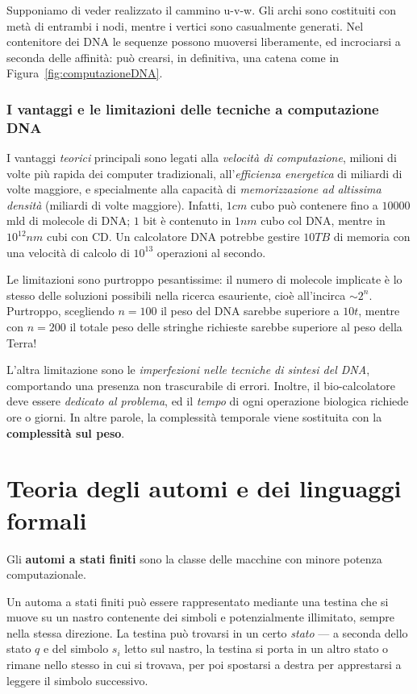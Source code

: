 \documentclass[10pt]{\classname}
\theoremstyle{definition}
\theoremstyle{definition}
\begin{document}
Supponiamo di veder realizzato il cammino u-v-w. Gli archi sono costituiti con
metà di entrambi i nodi, mentre i vertici sono casualmente generati. Nel
contenitore dei DNA le sequenze possono muoversi liberamente, ed incrociarsi a
seconda delle affinità: può crearsi, in definitiva, una catena come in
Figura~\ref{fig:computazioneDNA}.

\subsection{I vantaggi e le limitazioni delle tecniche a computazione DNA}

I vantaggi \emph{teorici} principali sono legati alla \emph{velocità di
computazione}, milioni di volte più rapida dei computer tradizionali,
all'\emph{efficienza energetica} di miliardi di volte maggiore, e specialmente
alla capacità di \emph{memorizzazione ad altissima densità} (miliardi di
volte maggiore). Infatti, $1cm$ cubo può contenere fino a $10000$ mld di
molecole di DNA; $1$ bit è contenuto in $1nm$ cubo col DNA, mentre in $10^{12}nm$
cubi con CD. Un calcolatore DNA potrebbe gestire $10TB$ di memoria con una
velocità di calcolo di $10^{13}$ operazioni al secondo.

Le limitazioni sono purtroppo pesantissime: il numero di molecole implicate è
lo stesso delle soluzioni possibili nella ricerca esauriente, cioè all'incirca
$\sim 2^n$. Purtroppo, scegliendo $n=100$ il peso del DNA sarebbe superiore a
$10t$, mentre con $n=200$ il totale peso delle stringhe richieste sarebbe
superiore al peso della Terra!

L'altra limitazione sono le \emph{imperfezioni nelle tecniche di sintesi del
DNA}, comportando una presenza non trascurabile di errori. Inoltre, il
bio-calcolatore deve essere \emph{dedicato al problema}, ed il \emph{tempo} di
ogni operazione biologica richiede ore o giorni. In altre parole, la
complessità temporale viene sostituita con la \textbf{complessità sul peso}.


\chapter{Teoria degli automi e dei linguaggi formali}

Gli \textbf{automi a stati finiti} sono la classe delle macchine con minore
potenza computazionale.

Un automa a stati finiti può essere rappresentato mediante una testina che si
muove su un nastro contenente dei simboli e potenzialmente illimitato, sempre
nella stessa direzione. La testina può trovarsi in un certo \emph{stato} --- a
seconda dello stato $q$ e del simbolo $s_i$ letto sul nastro, la testina si
porta in un altro stato o rimane nello stesso in cui si trovava, per poi
spostarsi a destra per apprestarsi a leggere il simbolo successivo.
\end{document}
